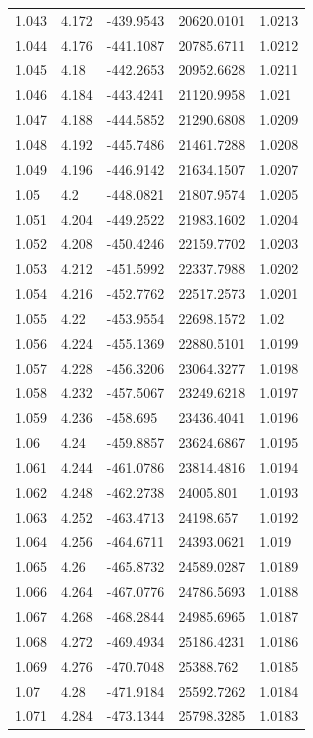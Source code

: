 \begin{tabular}{lllll}
1.043 & 4.172 & -439.9543 & 20620.0101 & 1.0213 \\
1.044 & 4.176 & -441.1087 & 20785.6711 & 1.0212 \\
1.045 & 4.18 & -442.2653 & 20952.6628 & 1.0211 \\
1.046 & 4.184 & -443.4241 & 21120.9958 & 1.021 \\
1.047 & 4.188 & -444.5852 & 21290.6808 & 1.0209 \\
1.048 & 4.192 & -445.7486 & 21461.7288 & 1.0208 \\
1.049 & 4.196 & -446.9142 & 21634.1507 & 1.0207 \\
1.05 & 4.2 & -448.0821 & 21807.9574 & 1.0205 \\
1.051 & 4.204 & -449.2522 & 21983.1602 & 1.0204 \\
1.052 & 4.208 & -450.4246 & 22159.7702 & 1.0203 \\
1.053 & 4.212 & -451.5992 & 22337.7988 & 1.0202 \\
1.054 & 4.216 & -452.7762 & 22517.2573 & 1.0201 \\
1.055 & 4.22 & -453.9554 & 22698.1572 & 1.02 \\
1.056 & 4.224 & -455.1369 & 22880.5101 & 1.0199 \\
1.057 & 4.228 & -456.3206 & 23064.3277 & 1.0198 \\
1.058 & 4.232 & -457.5067 & 23249.6218 & 1.0197 \\
1.059 & 4.236 & -458.695 & 23436.4041 & 1.0196 \\
1.06 & 4.24 & -459.8857 & 23624.6867 & 1.0195 \\
1.061 & 4.244 & -461.0786 & 23814.4816 & 1.0194 \\
1.062 & 4.248 & -462.2738 & 24005.801 & 1.0193 \\
1.063 & 4.252 & -463.4713 & 24198.657 & 1.0192 \\
1.064 & 4.256 & -464.6711 & 24393.0621 & 1.019 \\
1.065 & 4.26 & -465.8732 & 24589.0287 & 1.0189 \\
1.066 & 4.264 & -467.0776 & 24786.5693 & 1.0188 \\
1.067 & 4.268 & -468.2844 & 24985.6965 & 1.0187 \\
1.068 & 4.272 & -469.4934 & 25186.4231 & 1.0186 \\
1.069 & 4.276 & -470.7048 & 25388.762 & 1.0185 \\
1.07 & 4.28 & -471.9184 & 25592.7262 & 1.0184 \\
1.071 & 4.284 & -473.1344 & 25798.3285 & 1.0183 \\

\end{tabular}

